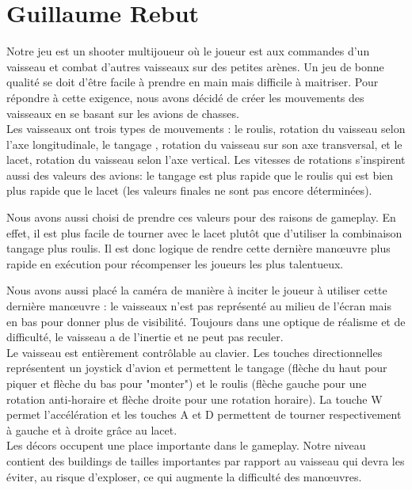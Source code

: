 \documentclass[10pt, titlepage]{report}
\begin{document}
\section{Guillaume Rebut}

Notre jeu est un shooter multijoueur où le joueur est aux commandes d'un vaisseau et combat d'autres vaisseaux sur des petites arènes. Un jeu de bonne qualité se doit d'être facile à prendre en main mais difficile à maitriser. Pour répondre à cette exigence, nous avons décidé de créer les mouvements des vaisseaux en se basant sur les avions de chasses.\\

 Les vaisseaux ont trois types de mouvements : le roulis, rotation du vaisseau selon l'axe longitudinale, le tangage , rotation du vaisseau sur son axe transversal, et le lacet, rotation du vaisseau selon l'axe vertical. Les vitesses de rotations s'inspirent aussi des valeurs des avions: le tangage est plus rapide que le roulis qui est bien plus rapide que le lacet (les valeurs finales ne sont pas encore déterminées).

 Nous avons aussi choisi de prendre ces valeurs pour des raisons de gameplay. En effet, il est plus facile de tourner avec le lacet plutôt que d'utiliser la combinaison tangage plus roulis. Il est donc logique de rendre cette dernière manœuvre plus rapide en exécution pour récompenser les joueurs les plus talentueux.

 Nous avons aussi placé la caméra de manière à inciter le joueur à utiliser cette dernière manœuvre : le vaisseaux n'est pas représenté au milieu de l'écran mais en bas pour donner plus de visibilité. Toujours dans une optique de réalisme et de difficulté, le vaisseau a de l'inertie et ne peut pas reculer.\\

Le vaisseau est entièrement contrôlable au clavier. Les touches directionnelles représentent un joystick d'avion et permettent le tangage (flèche du haut pour piquer et flèche du bas pour "monter") et le roulis (flèche gauche pour une rotation anti-horaire et flèche droite pour une rotation horaire). La touche W permet l'accélération et les touches A et D permettent de tourner respectivement à gauche et à droite grâce au lacet.\\

Les décors occupent une place importante dans le gameplay. Notre niveau contient des buildings de tailles importantes par rapport au vaisseau qui devra les éviter, au risque d'exploser, ce qui augmente la difficulté des manœuvres.
\end{document}
